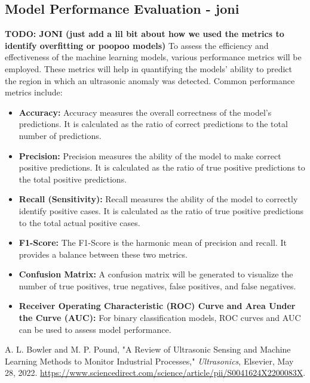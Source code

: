 \documentclass[conference]{IEEEtran}
\begin{document}
\subsection{Model Performance Evaluation - joni}
\textbf{TODO: JONI (just add a lil bit about how we used the metrics to identify overfitting or poopoo models)}
To assess the efficiency and effectiveness of the machine learning models, various performance metrics will be employed. These metrics will help in quantifying the models' ability to predict the region in which an ultrasonic anomaly was detected. Common performance metrics include:
\begin{itemize}
   \setlength\itemsep{8pt}
   \scriptsize
   \item \textbf{Accuracy:} Accuracy measures the overall correctness of the model's predictions. It is calculated as the ratio of correct predictions to the total number of predictions.

   \item \textbf{Precision:} Precision measures the ability of the model to make correct positive predictions. It is calculated as the ratio of true positive predictions to the total positive predictions.

   \item \textbf{Recall (Sensitivity):} Recall measures the ability of the model to correctly identify positive cases. It is calculated as the ratio of true positive predictions to the total actual positive cases.

   \item \textbf{F1-Score:} The F1-Score is the harmonic mean of precision and recall. It provides a balance between these two metrics.

   \item \textbf{Confusion Matrix:} A confusion matrix will be generated to visualize the number of true positives, true negatives, false positives, and false negatives.

   \item \textbf{Receiver Operating Characteristic (ROC) Curve and Area Under the Curve (AUC):} For binary classification models, ROC curves and AUC can be used to assess model performance.
\end{itemize}
\begin{thebibliography}{00}
     A. L. Bowler and M. P. Pound, "A Review of Ultrasonic Sensing and Machine Learning Methods to Monitor Industrial Processes," \textit{Ultrasonics}, Elsevier, May 28, 2022. \url{https://www.sciencedirect.com/science/article/pii/S0041624X2200083X}.
\end{thebibliography}
\end{document}
